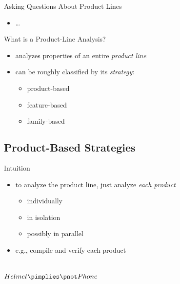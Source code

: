 \begin{frame}{\myframetitle}
\begin{fancycolumns}[t,widths={47}]
\begin{example}{Asking Questions About Product Lines}
\begin{itemize}
				\item \ldots
			\end{itemize}
		\end{example}
		\begin{definition}{What is a Product-Line Analysis?}
			\begin{itemize}
				\item analyzes properties of an entire \emph{product line}
				\item can be roughly classified by its \emph{strategy}:
				\begin{itemize}
					\item product-based
					\item feature-based
					\item family-based
				\end{itemize}
			\end{itemize}
		\end{definition}
	\end{fancycolumns}
\end{frame}

\subsection{Product-Based Strategies} %

\begin{frame}{\myframetitle}
	\begin{fancycolumns}
		\begin{definition}{Intuition}
			\begin{itemize}
				\item to analyze the product line, just analyze \emph{each product}
				\begin{itemize}
					\item individually
					\item in isolation
					\item possibly in parallel
				\end{itemize}
				\item e.g., compile and verify each product
			\end{itemize}
		\end{definition}
		\begin{exampletight}{}
			\centering\featureDiagramLego\\$Helmet \pimplies \pnot Phone$
		\end{exampletight}
	\nextcolumn
	\end{fancycolumns}
\end{frame}

